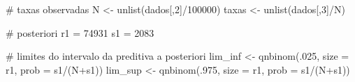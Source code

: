 \documentclass[
  letterpaper,
  DIV=11,
  numbers=noendperiod]{scrreprt}
\newenvironment{Shaded}{\begin{snugshade}}{\end{snugshade}}
\newcommand{\AttributeTok}[1]{\textcolor[rgb]{0.40,0.45,0.13}{#1}}
\newcommand{\CommentTok}[1]{\textcolor[rgb]{0.37,0.37,0.37}{#1}}
\newcommand{\DecValTok}[1]{\textcolor[rgb]{0.68,0.00,0.00}{#1}}
\newcommand{\FunctionTok}[1]{\textcolor[rgb]{0.28,0.35,0.67}{#1}}
\newcommand{\NormalTok}[1]{\textcolor[rgb]{0.00,0.23,0.31}{#1}}
\newcommand{\OtherTok}[1]{\textcolor[rgb]{0.00,0.23,0.31}{#1}}
\newcommand{\SpecialCharTok}[1]{\textcolor[rgb]{0.37,0.37,0.37}{#1}}
\theoremstyle{definition}
\theoremstyle{plain}
\theoremstyle{definition}
\theoremstyle{remark}
\begin{document}
\begin{Shaded}
\begin{Highlighting}[]
\CommentTok{\# taxas observadas}
\NormalTok{N }\OtherTok{\textless{}{-}} \FunctionTok{unlist}\NormalTok{(dados[,}\DecValTok{2}\NormalTok{]}\SpecialCharTok{/}\DecValTok{100000}\NormalTok{)}
\NormalTok{taxas }\OtherTok{\textless{}{-}} \FunctionTok{unlist}\NormalTok{(dados[,}\DecValTok{3}\NormalTok{]}\SpecialCharTok{/}\NormalTok{N)}

\CommentTok{\# posteriori}
\NormalTok{r1 }\OtherTok{=} \DecValTok{74931}
\NormalTok{s1 }\OtherTok{=} \DecValTok{2083}

\CommentTok{\# limites do intervalo da preditiva a posteriori}
\NormalTok{lim\_inf }\OtherTok{\textless{}{-}} \FunctionTok{qnbinom}\NormalTok{(.}\DecValTok{025}\NormalTok{, }\AttributeTok{size =}\NormalTok{ r1, }\AttributeTok{prob =}\NormalTok{ s1}\SpecialCharTok{/}\NormalTok{(N}\SpecialCharTok{+}\NormalTok{s1))}
\NormalTok{lim\_sup }\OtherTok{\textless{}{-}} \FunctionTok{qnbinom}\NormalTok{(.}\DecValTok{975}\NormalTok{, }\AttributeTok{size =}\NormalTok{ r1, }\AttributeTok{prob =}\NormalTok{ s1}\SpecialCharTok{/}\NormalTok{(N}\SpecialCharTok{+}\NormalTok{s1))}


\end{Highlighting}
\end{Shaded}
\end{document}
